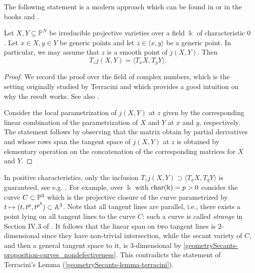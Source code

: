 The following statement is a modern approach which can be found in \cite[Corollary 1.10]{Adl87} or in the books \cite[Proposition II.1.10]{Zak93} and \cite[Theorem 1.4.1]{Rus16}.

\begin{lemma}
\label{geometrySecants-lemma-terracini}
    Let $X, Y \subseteq \mathbb{P}^N$ be irreducible projective varieties over a field $\Bbbk$ of characteristic $0$. Let $x \in X, y \in Y$ be generic points and let $z \in \langle x,y \rangle$ be a generic point. In particular, we may assume that $z$ is a smooth point of $j(X,Y)$. Then
    \[
        T_{z} j(X,Y) = \langle T_x X , T_y Y\rangle.
    \]
\end{lemma}
\begin{proof}
We record the proof over the field of complex numbers, which is the setting originally studied by Terracini and which provides a good intuition on why the result works. See also \cite{BO08}. 

Consider the local parametrization of $j(X,Y)$ at $z$ given by the corresponding linear combination of the parametrization of $X$ and $Y$ at $x$ and $y$, respectively. The statement follows by observing that the matrix obtain by partial derivatives and whose rows span the tangent space of $j(X,Y)$ at $z$ is obtained by elementary operation on the concatenation of the corresponding matrices for $X$ and $Y$. 
\end{proof}

\begin{example}
\label{geometrySecants-example-terracini_positive_char}
    In positive characteristics, only the inclusion $T_{z} j(X,Y) \supset \langle T_x X , T_y Y\rangle$ is guaranteed, see e.g. \cite[Proposition II.1.12]{Zak93}. For example, over $\Bbbk$ with ${\rm char}(\Bbbk)= p > 0$ consider the curve $C \subset \mathbb{P}^3$ which is the projective closure of the curve parametrized by $t \mapsto (t,t^p,t^{p^2}) \subset \mathbb{A}^3$. Note that all tangent lines are parallel, i.e., there exists a point lying on all tangent lines to the curve $C$: such a curve is called {\it strange} in Section IV.3 of \cite{Har77}. It follows that the linear span on two tangent lines is $2$-dimensional since they have non-trivial intersection, while the secant variety of $C$, and then a general tangent space to it, is $3$-dimensional by \ref{geometrySecants-proposition-curves_nondefectiveness}. This contradicts the statement of Terracini's Lemma (\ref{geometrySecants-lemma-terracini}).
\end{example}


